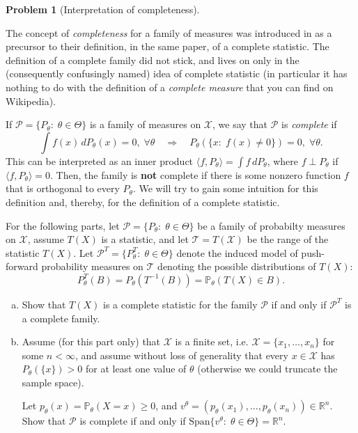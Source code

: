 \documentclass{article}
\newcommand{\cP}{\mathcal{P}}
\newcommand{\cX}{\mathcal{X}}
\newcommand{\cT}{\mathcal{T}}
\newcommand{\PP}{\mathbb{P}}
\newcommand{\RR}{\mathbb{R}}
\theoremstyle{definition}
\newtheorem{problem}{Problem}
\begin{document}
\begin{problem}[Interpretation of completeness]
\label{prob:interp-completeness}

The concept of {\em completeness} for a family of measures was introduced in \citet{lehmann1950completeness} as a precursor to their definition, in the same paper, of a complete statistic. The definition of a complete family did not stick, and lives on only in the (consequently confusingly named) idea of complete statistic (in particular it has nothing to do with the definition of a {\em complete measure} that you can find on Wikipedia).

If $\cP = \{P_\theta:\; \theta \in \Theta\}$ is a family of measures on $\cX$, we say that $\cP$ is {\em complete} if 
\[
\int f(x)\,d  P_\theta(x) = 0, \;\forall \theta \quad\Rightarrow\quad
P_\theta(\{x:\; f(x) \neq 0\}) = 0, \;\forall \theta.
\]
This can be interpreted as an inner product $\langle f, P_\theta\rangle = \int f\,d  P_\theta$, where $f \perp P_\theta$ if $\langle f, P_\theta\rangle = 0$. Then, the family is {\bf not} complete if there is some nonzero function $f$ that is orthogonal to every $P_\theta$. We will try to gain some intuition for this definition and, thereby, for the definition of a complete statistic.

For the following parts, let $\cP = \{P_\theta:\; \theta \in \Theta\}$ be a family of probabilty measures on $\cX$, assume $T(X)$ is a statistic, and let $\cT = T(\cX)$ be the range of the statistic $T(X)$. Let $\cP^T = \{P_\theta^T:\; \theta\in \Theta\}$ denote the induced model of push-forward probability measures on $\cT$ denoting the possible distributions of $T(X)$:
\[
P_\theta^T(B) = P_\theta(T^{-1}(B)) = \PP_\theta(T(X) \in B).
\]

\begin{enumerate}[(a)]
\item Show that $T(X)$ is a complete statistic for the family $\cP$ if and only if $\cP^T$ is a complete family.



\item Assume (for this part only) that $\cX$ is a finite set, i.e. $\cX = \{x_1,\ldots, x_n\}$ for some $n<\infty$, and assume without loss of generality that every $x\in\cX$ has $P_\theta(\{x\}) > 0$ for at least one value of $\theta$ (otherwise we could truncate the sample space). 

Let $p_\theta(x) = \PP_\theta(X = x) \geq 0$, and $v^\theta = (p_\theta(x_1),\ldots,p_\theta(x_n)) \in \RR^n$. Show that $\cP$ is complete if and only if $\text{Span}\{v^\theta:\;\theta\in\Theta\} = \RR^n$.




\end{enumerate}
\end{problem}
\end{document}
